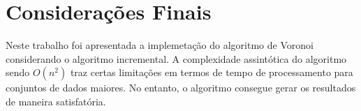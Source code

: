 \documentclass{article}
\begin{document}
\section{Considerações Finais}

Neste trabalho foi apresentada a implemetação do algoritmo de Voronoi considerando o algoritmo incremental. A complexidade assintótica do algoritmo sendo $O(n^2)$ traz certas limitações em termos de tempo de processamento para conjuntos de dados maiores. No entanto, o algoritmo consegue gerar os resultados de maneira satisfatória.



\end{document}
